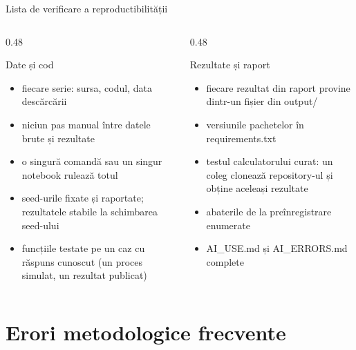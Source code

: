 \begin{frame}{Lista de verificare a reproductibilității}
\itemsize{\small}
\begin{columns}[T]
\begin{column}{0.48\textwidth}
\begin{block}{Date și cod}
\begin{itemize}
    \item fiecare serie: sursa, codul, data descărcării
    \item niciun pas manual între datele brute și rezultate
    \item o singură comandă sau un singur notebook rulează totul
    \item seed-urile fixate și raportate; rezultatele stabile la schimbarea seed-ului
    \item funcțiile testate pe un caz cu răspuns cunoscut (un proces simulat, un rezultat publicat)
\end{itemize}
\end{block}
\end{column}
\begin{column}{0.48\textwidth}
\begin{block}{Rezultate și raport}
\begin{itemize}
    \item fiecare rezultat din raport provine dintr-un fișier din output/
    \item versiunile pachetelor în requirements.txt
    \item testul calculatorului curat: un coleg clonează repository-ul și obține aceleași rezultate 
    \item abaterile de la preînregistrare enumerate
    \item AI\_USE.md și AI\_ERRORS.md complete
\end{itemize}
\end{block}
\end{column}
\end{columns}
\end{frame}


\section{Erori metodologice frecvente}


